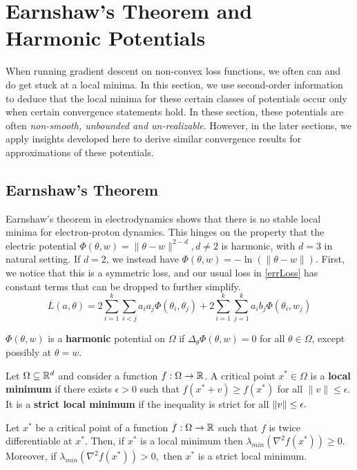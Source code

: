 \section{Earnshaw's Theorem and Harmonic Potentials} 
%
When running gradient descent on non-convex loss functions, we often
can and do get stuck at a local minima. In this section, we use
second-order information to deduce that the local
minima for these certain classes of potentials occur only when certain convergence statements hold. In these section, these potentials are often {\it non-smooth, unbounded and un-realizable}. However, in the later sections, we apply insights developed here to derive similar convergence results for approximations of these potentials.
%
\subsection{Earnshaw's Theorem}
%
Earnshaw's theorem in electrodynamics shows that there is no stable
local minima for electron-proton dynamics. This hinges on the property
that the electric potential
$\Phi(\theta,w) = \|\theta-w\|^{2-d}, d \neq 2$ is harmonic, with
$d = 3$ in natural setting. If $d = 2$, we instead have
$\Phi(\theta, w) = - \ln(\|\theta - w\|)$. First, we notice that this
is a symmetric loss, and our usual loss in \eqref{errLoss} has
constant terms that can be dropped to further simplify.
%
\begin{equation}\label{errSimp}
\overline{L}(a,\theta) =  2\sum_{i=1}^k\sum_{i < j} a_ia_j\Phi(\theta_i,\theta_j) + 2\sum_{i=1}^k\sum_{j=1}^ka_ib_j \Phi(\theta_i,w_j)
\end{equation} 
%
\begin{definition}
$\Phi(\theta,w)$ is a {\bf harmonic} potential on $\Omega$ if $\Delta_\theta \Phi(\theta,w) = 0$ for all $\theta \in \Omega$, except possibly at $\theta = w$.
\end{definition}

\begin{definition}
  Let $\Omega \subseteq {\mathbb{R}}^d$ and consider a function
  $f:\Omega \to {\mathbb{R}}$. A critical point $x^* \in \Omega$ is a {\bf local
    minimum} if there exists $\epsilon > 0$ such that
  $f(x^*+v) \geq f(x^*)$ for all $\|v\|\leq \epsilon$. It is a {\bf
    strict local minimum} if the inequality is strict for all
  $\left\lVert v \right\rVert \le \epsilon.$
\end{definition} 
%
\begin{fact}
  Let $x^*$ be a critical point of a function $f : \Omega \to {\mathbb{R}}$ such
  that $f$ is twice differentiable at $x^*.$ Then, if $x^*$ is a local
  minimum then $\lambda_{min}(\nabla^2 f(x^*)) \geq 0.$ Moreover, if
  $\lambda_{min}(\nabla^2 f(x^*)) > 0,$ then $x^*$ is a strict local minimum.
\end{fact}
%

